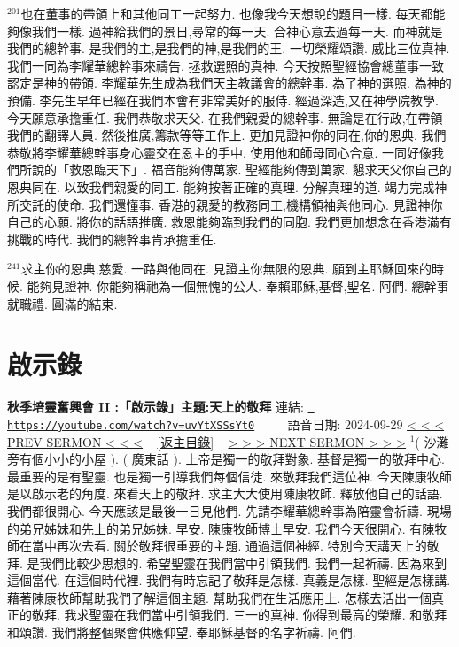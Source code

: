 \documentclass{book}
\begin{document}
$^{201}$也在董事的帶領上和其他同工一起努力.
也像我今天想說的題目一樣.
每天都能夠像我們一樣.
過神給我們的景日,尋常的每一天.
合神心意去過每一天.
而神就是我們的總幹事.
是我們的主,是我們的神,是我們的王.
一切榮耀頌讚.
威比三位真神.
我們一同為李耀華總幹事來禱告.
拯救選照的真神.
今天按照聖經協會總董事一致認定是神的帶領.
李耀華先生成為我們天主教議會的總幹事.
為了神的選照.
為神的預備.
李先生早年已經在我們本會有非常美好的服侍.
經過深造,又在神學院教學.
今天願意承擔重任.
我們恭敬求天父.
在我們親愛的總幹事.
無論是在行政,在帶領我們的翻譯人員.
然後推廣,籌款等等工作上.
更加見證神你的同在,你的恩典.
我們恭敬將李耀華總幹事身心靈交在恩主的手中.
使用他和師母同心合意.
一同好像我們所說的「救恩臨天下」.
福音能夠傳萬家.
聖經能夠傳到萬家.
懇求天父你自己的恩典同在.
以致我們親愛的同工.
能夠按著正確的真理.
分解真理的道.
竭力完成神所交託的使命.
我們還懂事.
香港的親愛的教務同工,機構領袖與他同心.
見證神你自己的心願.
將你的話語推廣.
救恩能夠臨到我們的同胞.
我們更加想念在香港滿有挑戰的時代.
我們的總幹事肯承擔重任.

$^{241}$求主你的恩典,慈愛.
一路與他同在.
見證主你無限的恩典.
願到主耶穌回來的時候.
能夠見證神.
你能夠稱祂為一個無愧的公人.
奉賴耶穌,基督,聖名.
阿們.
總幹事就職禮.
圓滿的結束.
\newpage



\section{啟示錄}
\label{sec:uvYtXSSsYt0}
\textbf{秋季培靈奮興會 II :「啟示錄」主題:天上的敬拜}
\newline
\newline
連結: \href{https://youtube.com/watch?v=uvYtXSSsYt0}{\texttt{ https://youtube.com/watch?v=uvYtXSSsYt0}} ~~~~ 語音日期: 2024-09-29 
\newline
\newline
\hyperref[sec:lB_bfqbs0xw]{\small{< < < PREV SERMON < < <}}
~
\hyperref[sec:index]{\small{[返主目錄]}}
~
\hyperref[sec:EjR8UEB4pjs]{\small{> > > NEXT SERMON > > >}}
\newline
\newline
$^{1}$( 沙灘旁有個小小的小屋 ).
( 廣東話 ).
上帝是獨一的敬拜對象.
基督是獨一的敬拜中心.
最重要的是有聖靈.
也是獨一引導我們每個信徒.
來敬拜我們這位神.
今天陳康牧師是以啟示老的角度.
來看天上的敬拜.
求主大大使用陳康牧師.
釋放他自己的話語.
我們都很開心.
今天應該是最後一日見他們.
先請李耀華總幹事為陪靈會祈禱.
現場的弟兄姊妹和先上的弟兄姊妹.
早安.
陳康牧師博士早安.
我們今天很開心.
有陳牧師在當中再次去看.
關於敬拜很重要的主題.
通過這個神經.
特別今天講天上的敬拜.
是我們比較少思想的.
希望聖靈在我們當中引領我們.
我們一起祈禱.
因為來到這個當代.
在這個時代裡.
我們有時忘記了敬拜是怎樣.
真義是怎樣.
聖經是怎樣講.
藉著陳康牧師幫助我們了解這個主題.
幫助我們在生活應用上.
怎樣去活出一個真正的敬拜.
我求聖靈在我們當中引領我們.
三一的真神.
你得到最高的榮耀.
和敬拜和頌讚.
我們將整個聚會供應仰望.
奉耶穌基督的名字祈禱.
阿們.
\end{document}
